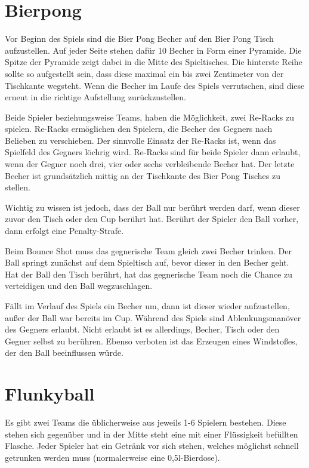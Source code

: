 \documentclass[a4paper]{report}
\begin{document}
\section*{Bierpong}
Vor Beginn des Spiels sind die Bier Pong Becher auf den Bier Pong Tisch aufzustellen. Auf jeder Seite stehen dafür 10 Becher in Form einer Pyramide. Die Spitze der Pyramide zeigt dabei in die Mitte des Spieltisches. Die hinterste Reihe sollte so aufgestellt sein, dass diese maximal ein bis zwei Zentimeter von der Tischkante wegsteht. Wenn die Becher im Laufe des Spiels verrutschen, sind diese erneut in die richtige Aufstellung zurückzustellen.

Beide Spieler beziehungsweise Teams, haben die Möglichkeit, zwei Re-Racks zu spielen. Re-Racks ermöglichen den Spielern, die Becher des Gegners nach Belieben zu verschieben. Der sinnvolle Einsatz der Re-Racks ist, wenn das Spielfeld des Gegners löchrig wird. Re-Racks sind für beide Spieler dann erlaubt, wenn der Gegner noch drei, vier oder sechs verbleibende Becher hat. Der letzte Becher ist grundsätzlich mittig an der Tischkante des Bier Pong Tisches zu stellen.

Wichtig zu wissen ist jedoch, dass der Ball nur berührt werden darf, wenn dieser zuvor den Tisch oder den Cup berührt hat. Berührt der Spieler den Ball vorher, dann erfolgt eine Penalty-Strafe.

Beim Bounce Shot muss das gegnerische Team gleich zwei Becher trinken. Der Ball springt zunächst auf dem Spieltisch auf, bevor dieser in den Becher geht. Hat der Ball den Tisch berührt, hat das gegnerische Team noch die Chance zu verteidigen und den Ball wegzuschlagen.

Fällt im Verlauf des Spiels ein Becher um, dann ist dieser wieder aufzustellen, außer der Ball war bereits im Cup. Während des Spiels sind Ablenkungsmanöver des Gegners erlaubt. Nicht erlaubt ist es allerdings, Becher, Tisch oder den Gegner selbst zu berühren. Ebenso verboten ist das Erzeugen eines Windstoßes, der den Ball beeinflussen würde.

\section*{Flunkyball}
Es gibt zwei Teams die üblicherweise aus jeweils 1-6 Spielern bestehen. Diese stehen sich gegenüber und in der Mitte steht eine mit einer Flüssigkeit befüllten Flasche. Jeder Spieler hat ein Getränk vor sich stehen, welches möglichst schnell getrunken werden muss (normalerweise eine 0,5l-Bierdose).
\end{document}
